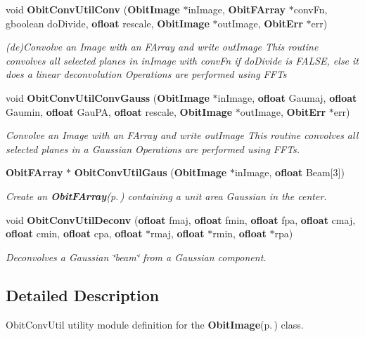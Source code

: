 \begin{CompactItemize}
\item 
void {\bf Obit\-Conv\-Util\-Conv} ({\bf Obit\-Image} $\ast$in\-Image, {\bf Obit\-FArray} $\ast$conv\-Fn, gboolean do\-Divide, {\bf ofloat} rescale, {\bf Obit\-Image} $\ast$out\-Image, {\bf Obit\-Err} $\ast$err)
\begin{CompactList}\small\item\em (de)Convolve an Image with an FArray and write out\-Image This routine convolves all selected planes in in\-Image with conv\-Fn if do\-Divide is FALSE, else it does a linear deconvolution Operations are performed using FFTs \item\end{CompactList}\item 
void {\bf Obit\-Conv\-Util\-Conv\-Gauss} ({\bf Obit\-Image} $\ast$in\-Image, {\bf ofloat} Gaumaj, {\bf ofloat} Gaumin, {\bf ofloat} Gau\-PA, {\bf ofloat} rescale, {\bf Obit\-Image} $\ast$out\-Image, {\bf Obit\-Err} $\ast$err)
\begin{CompactList}\small\item\em Convolve an Image with an FArray and write out\-Image This routine convolves all selected planes in a Gaussian Operations are performed using FFTs. \item\end{CompactList}\item 
{\bf Obit\-FArray} $\ast$ {\bf Obit\-Conv\-Util\-Gaus} ({\bf Obit\-Image} $\ast$in\-Image, {\bf ofloat} Beam[3])
\begin{CompactList}\small\item\em Create an {\bf Obit\-FArray}{\rm (p.\,\pageref{structObitFArray})} containing a unit area Gaussian in the center. \item\end{CompactList}\item 
void {\bf Obit\-Conv\-Util\-Deconv} ({\bf ofloat} fmaj, {\bf ofloat} fmin, {\bf ofloat} fpa, {\bf ofloat} cmaj, {\bf ofloat} cmin, {\bf ofloat} cpa, {\bf ofloat} $\ast$rmaj, {\bf ofloat} $\ast$rmin, {\bf ofloat} $\ast$rpa)
\begin{CompactList}\small\item\em Deconvolves a Gaussian \char`\"{}beam\char`\"{} from a Gaussian component. \item\end{CompactList}\end{CompactItemize}


\subsection{Detailed Description}
Obit\-Conv\-Util utility module definition for the {\bf Obit\-Image}{\rm (p.\,\pageref{structObitImage})} class. 

